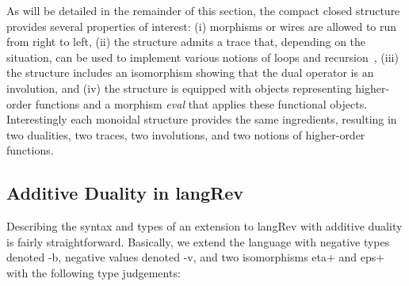 \documentclass[preprint]{sigplanconf}
\begin{document}
As will be detailed in the remainder of this section, the compact closed
structure provides several properties of interest: (i) morphisms or wires are
allowed to run from right to left, (ii) the structure admits a trace that,
depending on the situation, can be used to implement various notions of loops
and
recursion~\cite{joyal1996traced,Hasegawa:2009:TMC:1552068.1552069,Hasegawa:1997:RCS:645893.671607},
(iii) the structure includes an isomorphism showing that the dual
operator is an involution, and (iv) the structure is equipped with
objects representing higher-order functions and a morphism
\textit{eval} that applies these functional objects. Interestingly
each monoidal structure provides the same ingredients, resulting in
two dualities, two traces, two involutions, and two notions of
higher-order functions.

\subsection{Additive Duality in {{langRev}} }
\label{sec:neg}

Describing the syntax and types of an extension to {{langRev}} with additive
duality is fairly straightforward. Basically, we extend the language with
negative types denoted {{-b}}, negative values denoted {{-v}}, and two
isomorphisms {{eta+}} and {{eps+}} with the following type judgements:

%

\vspace{-15pt}
\begin{multicols}{2}  

\end{multicols}
\end{document}
